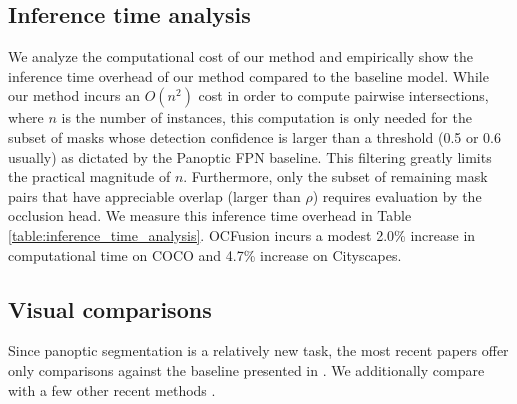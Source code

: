 \documentclass[10pt,twocolumn,letterpaper]{article}
\begin{document}
\subsection{Inference time analysis}
We analyze the computational cost of our method and empirically show the inference time overhead of our method compared to the baseline model. While our method incurs an $O(n^2)$ cost in order to compute pairwise intersections, where $n$ is the number of instances, this computation is only needed for the subset of masks whose detection confidence is larger than a threshold (0.5 or 0.6 usually) as dictated by the Panoptic FPN \cite{kirillov2019panoptic} baseline. This filtering greatly limits the practical magnitude of $n$. Furthermore, only the subset of remaining mask pairs that have appreciable overlap (larger than $\rho$) requires evaluation by the occlusion head. We measure this inference time overhead in Table \ref{table:inference_time_analysis}. OCFusion incurs a modest 2.0\% increase in computational time on COCO and 4.7\% increase on Cityscapes.

\vspace{-1.5mm}
\begin{table}[!htp]
\vspace{-0mm}
\centering
{}
\vspace{-2mm}
\caption{ \textbf{Runtime (ms) overhead per image.} Runtime results are averaged over the entire COCO and Cityscapes validation dataset. We use a single GeForce GTX 1080 Ti GPU and Xeon(R) CPU E5-2687W CPU.
} 
\label{table:inference_time_analysis}
\vspace{-5mm}
\end{table}



\subsection{Visual comparisons}

Since panoptic segmentation is a relatively new task, the most recent papers offer only comparisons against the baseline presented in \cite{kirillov2018panoptic}. We additionally compare with a few other recent methods \cite{liu2019end,xiong2019upsnet}.
\end{document}

